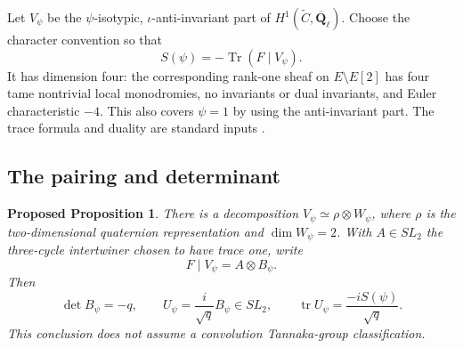 \documentclass[11pt,a4paper]{article}
\numberwithin{equation}{section}
\newtheorem{prop}{Proposed Proposition}[section]
\newcommand{\Q}{\overline{\mathbf Q}_{\ell}}
\newcommand{\Tr}{\operatorname{Tr}}
\newcommand{\tr}{\operatorname{tr}}
\begin{document}
Let $V_\psi$ be the $\psi$-isotypic, $\iota$-anti-invariant part of $H^1(\widetilde C,\Q)$. Choose the character convention so that
\begin{equation}\label{eq:tracesign}
 S(\psi)=-\Tr(F\mid V_\psi).
\end{equation}
It has dimension four: the corresponding rank-one sheaf on $E\setminus E[2]$ has four tame nontrivial local monodromies, no invariants or dual invariants, and Euler characteristic $-4$. This also covers $\psi=1$ by using the anti-invariant part. The trace formula and duality are standard inputs \cite{Milne}.

\subsection{The pairing and determinant}
\begin{prop}\label{prop:det}
There is a decomposition $V_\psi\simeq\rho\otimes W_\psi$, where $\rho$ is the two-dimensional quaternion representation and $\dim W_\psi=2$. With $A\in SL_2$ the three-cycle intertwiner chosen to have trace one, write
\begin{equation}
 F\mid V_\psi=A\otimes B_\psi.
\end{equation}
Then
\begin{equation}\label{eq:det}
 \boxed{\det B_\psi=-q,\qquad
 U_\psi=\frac{i}{\sqrt q}B_\psi\in SL_2,\qquad
 \tr U_\psi=\frac{-iS(\psi)}{\sqrt q}.}
\end{equation}
This conclusion does not assume a convolution Tannaka-group classification.
\end{prop}
\end{document}
